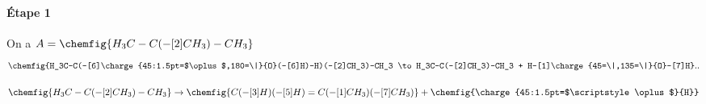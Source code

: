 \documentclass{article}
\newcommand{\chg}[2]{\charge{45:1.5pt=$\scriptstyle#1$}{#2}}
\begin{document}
\subsubsection{}
\paragraph{Étape 1}
On a $A = \chemfig{H_3C-C(-[2]CH_3)-CH_3}$
\[
	\chemfig{H_3C-C(-[6]\charge{45:1.5pt=$\oplus$,180=\|}{O}(-[6]H)-H)(-[2]CH_3)-CH_3 
	\to H_3C-C(-[2]CH_3)-CH_3 + H-[1]\charge{45=\|,135=\|}{O}-[7]H}
.
.\]

\[
	\chemfig{H_3C-C(-[2]CH_3)-CH_3} \to 
	\chemfig{C(-[3]H)(-[5]H)=C(-[1]CH_3)(-[7]CH_3)} + \chemfig{\chg{\oplus}{H}}
\] 
\end{document}
